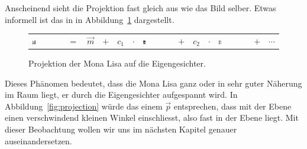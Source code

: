 Anscheinend sieht die Projektion fast gleich aus wie das Bild selber.
Etwas informell ist das in in Abbildung~\ref{fig:eigen_basis} dargestellt.
\begin{figure}[ht]
	\centering
	\begin{tabular}{m{1.8cm} c c c c c m{2cm} c c c m{2cm} c c}
		\includegraphics[width=0.1\textwidth]{images/eigenfaces/mona_lisa_eigen_approx} &
		$=$ & $\vec m$ & $+$ & $c_1$ & $\cdot$ & \includegraphics[width=0.1\textwidth]{images/eigenfaces/eigenface00}
		& $+$ & $c_2$ & $\cdot$ & \includegraphics[width=0.1\textwidth]{images/eigenfaces/eigenface01} & $+$ & $\cdots$
	\end{tabular}
	\caption{Projektion der Mona Lisa auf die Eigengesichter.}
	\label{fig:eigen_basis}
\end{figure}
Dieses Phänomen bedeutet, dass die Mona Lisa ganz oder in sehr guter Näherung im Raum liegt, er durch die Eigengesichter aufgespannt wird.
In Abbildung~\ref{fig:projection} würde das einem $\vec p$ entsprechen, dass mit der Ebene einen verschwindend kleinen Winkel einschliesst, also fast in der Ebene liegt.
Mit dieser Beobachtung wollen wir uns im nächsten Kapitel genauer auseinandersetzen.